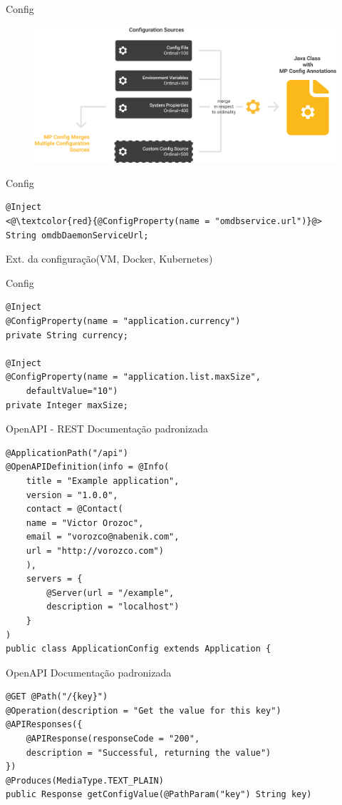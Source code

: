 \documentclass[aspectratio=169]{beamer}
\begin{document}
\begin{frame}{Config}
\begin{figure}
	\centering
	\includegraphics[width=0.8\linewidth]{Images/mpconfig}
\end{figure}
\end{frame}




\begin{frame}[fragile]{Config}
\begin{lstlisting}
@Inject
<@\textcolor{red}{@ConfigProperty(name = "omdbservice.url")}@>
String omdbDaemonServiceUrl;
\end{lstlisting}

Ext. da configuração(VM, Docker, Kubernetes)
\end{frame}



\begin{frame}[fragile]{Config}
\begin{lstlisting}
@Inject
@ConfigProperty(name = "application.currency")
private String currency;

@Inject
@ConfigProperty(name = "application.list.maxSize",
	defaultValue="10")
private Integer maxSize;
\end{lstlisting}
\end{frame}


\begin{frame}[fragile]{OpenAPI - REST}
Documentação padronizada
\begin{lstlisting}
@ApplicationPath("/api")
@OpenAPIDefinition(info = @Info(
	title = "Example application",
	version = "1.0.0",
	contact = @Contact(
	name = "Victor Orozoc",
	email = "vorozco@nabenik.com",
	url = "http://vorozco.com")
	),
	servers = {
		@Server(url = "/example",
		description = "localhost")
	}
)
public class ApplicationConfig extends Application {
\end{lstlisting}
\end{frame}

\begin{frame}[fragile]{OpenAPI}
Documentação padronizada
\begin{lstlisting}
@GET @Path("/{key}")
@Operation(description = "Get the value for this key")
@APIResponses({
	@APIResponse(responseCode = "200",
	description = "Successful, returning the value")
})
@Produces(MediaType.TEXT_PLAIN)
public Response getConfigValue(@PathParam("key") String key)
\end{lstlisting}
\end{frame}
\end{document}
